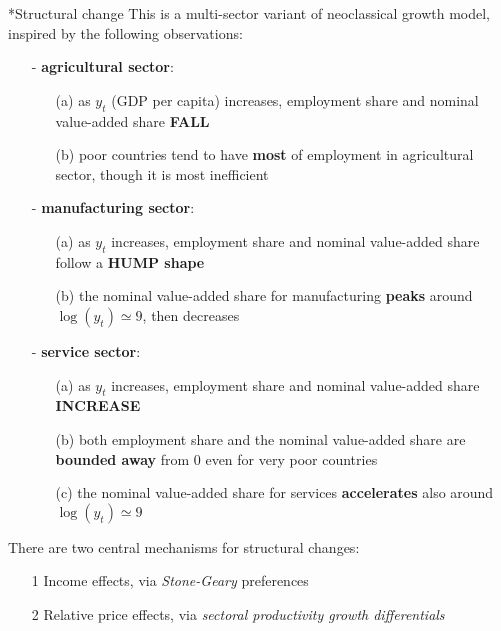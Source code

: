 \documentclass[10pt,landscape,a4paper]{article}
\makeatletter
\renewcommand{\section}{\@startsection{section}{1}{0mm}{1ex}{.2ex}{\normalsize\bfseries}}
\makeatother
\begin{document}
\begin{multicols*}{3}
\section*{Structural change}
This is a multi-sector variant of neoclassical growth model, inspired by the following observations:
\begin{itemize}
    \item[-] \textbf{\color{myred}agricultural sector}:
    \begin{itemize}
        \item[(a)] as $y_t$ (GDP per capita) increases, employment share and nominal value-added share \textbf{\color{myred}FALL}
        \item[(b)] poor countries tend to have \textbf{most} of employment in agricultural sector, though it is most inefficient
    \end{itemize}
    
    \item[-] \textbf{\color{myred}manufacturing sector}:
    \begin{itemize}
        \item[(a)] as $y_t$ increases, employment share and nominal value-added share follow a \textbf{\color{myred}HUMP shape}
        \item[(b)] the nominal value-added share for manufacturing \textbf{peaks} around $\log(y_t)\simeq 9$, then decreases
    \end{itemize}

    \item[-] \textbf{\color{myred}service sector}: 
    \begin{itemize}
        \item[(a)] as $y_t$ increases, employment share and nominal value-added share \textbf{\color{myred}INCREASE}
        \item[(b)] both employment share and the nominal value-added share are \textbf{bounded away} from 0 even for very poor countries
        \item[(c)] the nominal value-added share for services \textbf{accelerates} also around $\log(y_t)\simeq 9$
    \end{itemize}
\end{itemize}

There are two central mechanisms for structural changes:
\begin{itemize}
    \item[1] Income effects, via \textit{Stone-Geary} preferences
    \item[2] Relative price effects, via \textit{sectoral productivity growth differentials}
\end{itemize}


\end{multicols*}
\end{document}

